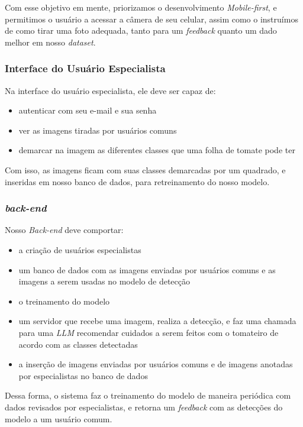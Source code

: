 Com esse objetivo em mente, priorizamos o desenvolvimento \textit{Mobile-first}, e permitimos o usuário a acessar a câmera de seu celular, assim como o instruímos de como tirar uma foto adequada, tanto para um \textit{feedback} quanto um dado melhor em nosso \textit{dataset}.

\subsubsection{{Interface do Usuário Especialista} \label{sec:abst-esp}}

Na interface do usuário especialista, ele deve ser capaz de:

\begin{itemize}
    \item autenticar com seu e-mail e sua senha
    \item ver as imagens tiradas por usuários comuns
    \item demarcar na imagem as diferentes classes que uma folha de tomate pode ter
\end{itemize}

Com isso, as imagens ficam com suas classes demarcadas por um quadrado, e inseridas em nosso banco de dados, para retreinamento do nosso modelo. 

\subsubsection{{\emph{back-end}}\label{sec:back-end-intro}}

Nosso \emph{Back-end} deve comportar:

\begin{itemize}
    \item a criação de usuários especialistas
    \item um banco de dados com as imagens enviadas por usuários comuns e as imagens a serem usadas no modelo de detecção
    \item o treinamento do modelo
    \item um servidor que recebe uma imagem, realiza a detecção, e faz uma chamada para uma \emph{LLM} recomendar cuidados a serem feitos com o tomateiro de acordo com as classes detectadas
    \item a inserção de imagens enviadas por usuários comuns e de imagens anotadas por especialistas no banco de dados
\end{itemize}

Dessa forma, o sistema faz o treinamento do modelo de maneira periódica com dados revisados por especialistas, e retorna um \textit{feedback} com as detecções do modelo a um usuário comum.

